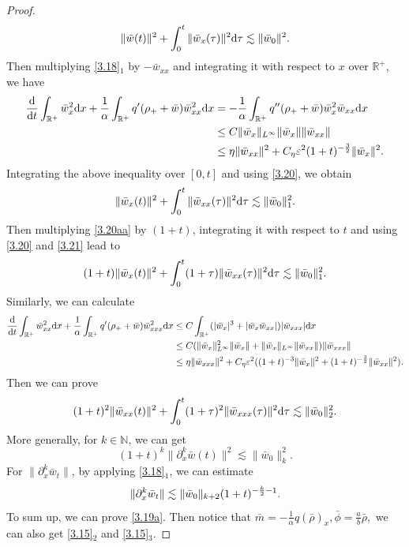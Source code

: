 \documentclass[11pt]{article}
\theoremstyle{plain}
\numberwithin{equation}{section}
\begin{document}
\begin{proof}
\begin{equation}\label{3.20}
   \|\bar w(t)\|^{2}+\int_{0}^{t}\|\bar w_{x}(\tau)\|^{2}{\rm d}\tau \lesssim  \|\bar w_{0}\|^{2}.
  \end{equation}
Then multiplying \eqref{3.18}$_1$ by $-{\bar w}_{xx}$ and integrating it with respect to $x$ over $\mathbb{R}^+$, we have
\begin{align}\label{3.20aa}
 \frac{{\rm d}}{{\rm d}t}\int_{\mathbb{R}^+} \bar{w}_x^2{\rm d} x+\frac{1}{\alpha}\int_{\mathbb{R}^+} q'(\rho_++\bar w)\bar w_{xx}^{2}{\rm d}x &=-\frac{1}{\alpha}\int_{\mathbb{R}^+} q''(\rho_++\bar w)\bar w_{x}^2\bar w_{xx}{\rm d}x\notag\\
 &\leq C\|\bar w_{x}\|_{L^\infty}\|\bar w_{x}\|\|\bar w_{xx}\|\notag\\
 &\leq \eta\|\bar w_{xx}\|^2+C_\eta\varepsilon^2(1+t)^{-\frac{3}{2}}\|\bar w_{x}\|^2.
\end{align}
Integrating the above inequality over $[0, t]$ and using \eqref{3.20}, we obtain
\begin{equation}\label{3.21}
   \|\bar w_x(t)\|^{2}+\int_{0}^{t}\|\bar w_{xx}(\tau)\|^{2}{\rm d}\tau \lesssim  \|\bar w_{0}\|_1^{2}.
  \end{equation}
  Then multiplying \eqref{3.20aa} by $(1 + t)$, integrating it with respect to $t$ and using \eqref{3.20} and \eqref{3.21} lead to
\begin{equation}\label{3.22}
  (1+t) \|\bar w_x(t)\|^{2}+\int_{0}^{t}(1+\tau)\|\bar w_{xx}(\tau)\|^{2}{\rm d}\tau \lesssim  \|\bar w_{0}\|_1^{2}.
  \end{equation}
Similarly, we can calculate
\begin{align}\notag
 \frac{{\rm d}}{{\rm d}t}\int_{\mathbb{R}^+} \bar{w}_{xx}^2{\rm d} x+\frac{1}{\alpha}\int_{\mathbb{R}^+} q'(\rho_++\bar w)\bar w_{xxx}^{2}{\rm d}x &\leq C\int_{\mathbb{R}^+} (|\bar w_x|^3+|\bar w_x\bar w_{xx}|)|\bar w_{xxx}|{\rm d}x\notag\\
 &\leq C(\|\bar w_{x}\|^2_{L^\infty}\|\bar w_{x}\|+\|\bar w_{x}\|_{L^\infty}\|\bar w_{xx}\|)\|\bar w_{xxx}\|\notag\\
 &\leq \eta\|\bar w_{xxx}\|^2+C_\eta\varepsilon^2((1+t)^{-3}\|\bar w_{x}\|^2+(1+t)^{-\frac{3}{2}}\|\bar w_{xx}\|^2).\notag
\end{align}
Then we can prove
\begin{equation}\label{3.23}
  (1+t)^2 \|\bar w_{xx}(t)\|^{2}+\int_{0}^{t}(1+\tau)^2\|\bar w_{xxx}(\tau)\|^{2}{\rm d}\tau \lesssim  \|\bar w_{0}\|_2^{2}.
  \end{equation}
More generally, for $k\in \mathbb{N}$, we can get 
\begin{equation}\label{3.24}
  (1+t)^k \|\partial_x^k\bar w(t)\|^{2}\lesssim  \|\bar w_{0}\|_k^{2}.
  \end{equation} 
For $\|\partial_x^k\bar w_{t}\|$, by applying \eqref{3.18}$_1$, we can estimate
\begin{equation}\notag
\|\partial_x^k\bar w_{t}\|\lesssim\|\bar w_{0}\|_{k+2}(1+t)^{-\frac{k}{2}-1}.	
\end{equation}
To sum up, we can prove \eqref{3.19a}. Then notice that $\bar m=-\frac{1}{\alpha}q(\bar\rho)_x, \bar\phi=\frac{a}{b}\bar\rho,$ we can also get \eqref{3.15}$_2$ and \eqref{3.15}$_3$.
\end{proof}
\end{document}
